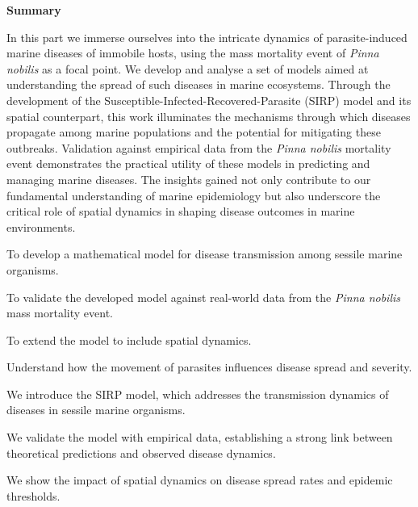 \thispagestyle{empty}

\begin{center}
  \textbf{\Large Summary}
\end{center}

In this part we immerse ourselves into the intricate dynamics of
parasite-induced
marine diseases of immobile hosts, using the mass mortality event of
\textit{Pinna nobilis} as a focal point. We develop and analyse a set of models
aimed at understanding the spread of such diseases in marine ecosystems.
Through the development of the Susceptible-Infected-Recovered-Parasite (SIRP)
model and its spatial counterpart, this work illuminates the mechanisms through
which diseases propagate among marine populations and the potential for
mitigating these outbreaks. Validation against empirical data from the
\textit{Pinna nobilis} mortality event demonstrates the practical utility of
these models in predicting and managing marine diseases. The insights gained
not only contribute to our fundamental understanding of marine epidemiology but
also underscore the critical role of spatial dynamics in shaping disease
outcomes in marine environments.

\vspace{2cm}

\begin{objectiveslist}
  \item To develop a mathematical model for disease
  transmission among sessile marine organisms.

  \item To validate the developed model against real-world data from the
  \textit{Pinna nobilis} mass mortality event.

  \item To extend the model to include spatial dynamics.

  \item Understand how the movement of parasites influences disease spread and
  severity.
\end{objectiveslist}

\vspace{2cm}

\begin{contributionslist}
  \item We introduce the SIRP model, which addresses the
  transmission dynamics of diseases in sessile marine organisms.

  \item  We validate the model with empirical data, establishing a
  strong link between theoretical predictions and observed disease dynamics.

  \item We show the impact of spatial dynamics on disease spread rates and
  epidemic thresholds.
\end{contributionslist}